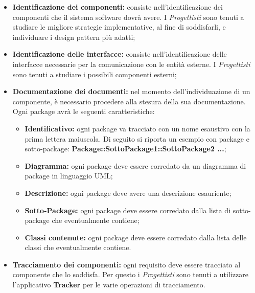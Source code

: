  \begin{itemize}
 	\item \textbf{Identificazione dei componenti: }consiste nell'identificazione dei componenti che il sistema software dovrà avere. I \textit{Progettisti} sono tenuti a studiare le migliore strategie implementative, al fine di soddisfarli, e individuare i design pattern più adatti;
 	\item \textbf{Identificazione delle interfacce: }consiste nell'identificazione delle interfacce necessarie per la comunicazione con le entità esterne. I \textit{Progettisti} sono tenuti a studiare i possibili componenti esterni;
 	\item \textbf{Documentazione dei documenti: }nel momento dell'individuazione di un componente, è necessario procedere alla stesura della sua documentazione. Ogni package avrà le seguenti caratteristiche:
	 	\begin{itemize}
	 		\item \textbf{Identificativo: }ogni package va tracciato con un nome esaustivo con la prima lettera maiuscola. Di seguito si riporta un esempio con package e sotto-package:
	 		{\centering \textbf{Package::SottoPackage1::SottoPackage2 ...};}
	 		\item \textbf{Diagramma: }ogni package deve essere corredato da un diagramma di package in linguaggio UML;
	 		\item \textbf{Descrizione: }ogni package deve avere una descrizione esauriente;
	 		\item \textbf{Sotto-Package: }ogni package deve essere corredato dalla lista di sotto-package che eventualmente contiene;
	 		\item \textbf{Classi contenute: }ogni package deve essere corredato dalla lista delle classi che eventualmente contiene.
	 	\end{itemize}
	 \item \textbf{Tracciamento dei componenti: }ogni requisito deve essere tracciato al componente che lo soddisfa. Per questo i \textit{Progettisti} sono tenuti a utilizzare l'applicativo \textbf{Tracker} per le varie operazioni di tracciamento.
 \end{itemize}
 
